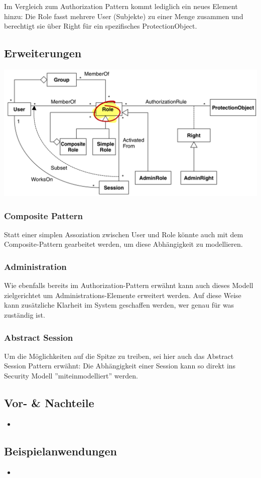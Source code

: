 Im Vergleich zum Authorization Pattern kommt lediglich ein neues Element hinzu: Die Role fasst mehrere User (Subjekte) zu einer Menge zusammen und berechtigt sie über Right für ein spezifisches ProtectionObject.


\subsection*{Erweiterungen}
\includegraphics[width=\textwidth]{chapter/01basic/rolebasedaccesscontroladvanced.png}

\subsubsection*{Composite Pattern}
Statt einer simplen Assoziation zwischen User und Role könnte auch mit dem Composite-Pattern gearbeitet werden, um diese Abhängigkeit zu modellieren.

\subsubsection*{Administration}
Wie ebenfalls bereits im Authorization-Pattern erwähnt kann auch dieses Modell zielgerichtet um Administrations-Elemente erweitert werden.
Auf diese Weise kann zusätzliche Klarheit im System geschaffen werden, wer genau für was zuständig ist.

\subsubsection*{Abstract Session}
Um die Möglichkeiten auf die Spitze zu treiben, sei hier auch das Abstract Session Pattern erwähnt: Die Abhängigkeit einer Session kann so direkt ins Security Modell ''miteinmodelliert'' werden.

\subsection*{Vor- \& Nachteile}
\begin{itemize}
	\item 
\end{itemize}

\subsection*{Beispielanwendungen}
\begin{itemize}
	\item 
\end{itemize}